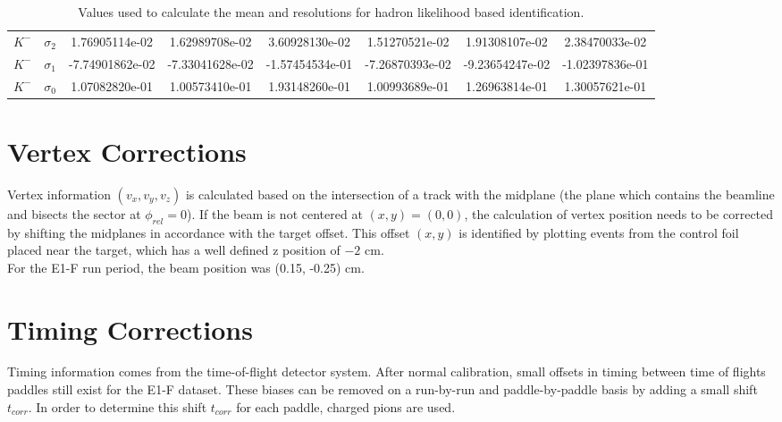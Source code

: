 \begin{landscape}
\begin{table}
\begin{tabular}{c|c|c|c|c|c|c|c}
    $K^-$ & $\sigma_2$ & 1.76905114e-02 &     1.62989708e-02 &     3.60928130e-02 &     1.51270521e-02 &     1.91308107e-02 &     2.38470033e-02 \\
    $K^-$ & $\sigma_1$ & -7.74901862e-02 &    -7.33041628e-02 &    -1.57454534e-01 &    -7.26870393e-02 &     -9.23654247e-02 &    -1.02397836e-01 \\
    $K^-$ & $\sigma_0$ & 1.07082820e-01 &     1.00573410e-01 &     1.93148260e-01 &     1.00993689e-01 &     1.26963814e-01 &     1.30057621e-01
  \end{tabular}
  \caption{Values used to calculate the mean and resolutions for hadron likelihood based identification.}
  \label{table-hadron-pdfs}
  \end{table}
\end{landscape}


\section{Vertex Corrections}
Vertex information $(v_x, v_y, v_z)$ is calculated based on the intersection of a track with the midplane (the plane which contains the beamline and bisects the sector at $\phi_{rel} = 0$).  If the beam is not centered at $(x,y)=(0,0)$, the calculation of vertex position needs to be corrected by shifting the midplanes in accordance with the target offset.  This offset $(x,y)$ is identified by plotting events from the control foil placed near the target, which has a well defined z position of $-2$ cm. \\
      
For the E1-F run period, the beam position was (0.15, -0.25) cm.  


\section{Timing Corrections}
Timing information comes from the time-of-flight detector system.  After normal calibration, small offsets in timing between time of flights paddles still exist for the E1-F dataset.  These biases can be removed on a run-by-run and paddle-by-paddle basis by adding a small shift $t_{corr}$.  In order to determine this shift $t_{corr}$ for each paddle, charged pions are used.  \\

